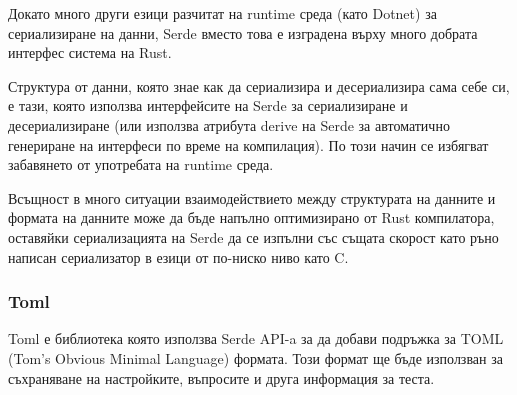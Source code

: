 Докато много други езици разчитат на runtime среда (като Dotnet) за
сериализиране на данни, Serde вместо това е изградена върху много добрата
интерфес система на Rust.

Структура от данни, която знае как да сериализира и десериализира сама себе си,
е тази, която използва интерфейсите на Serde за сериализиране и десериализиране
(или използва атрибута derive на Serde за автоматично генериране на интерфеси
по време на компилация). По този начин се избягват забавянето от употребата на
runtime среда.

Всъщност в много ситуации взаимодействието между структурата на данните и
формата на данните може да бъде напълно оптимизирано от Rust компилатора,
оставяйки сериализацията на Serde да се изпълни със същата скорост като
ръно написан сериализатор в езици от по-ниско ниво като C.

\subsubsection{Toml}
Toml е библиотека която използва Serde API-a за да добави подръжка за TOML
(Tom's Obvious Minimal Language) формата. Този формат ще бъде използван за
съхраняване на настройките, въпросите и друга информация за теста.


